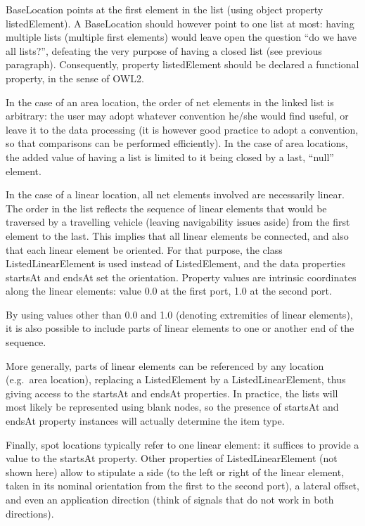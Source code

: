 \documentclass[
  11pt,
]{article}
\begin{document}
BaseLocation points at the first element in the list (using object
property listedElement). A BaseLocation should however point to one list
at most: having multiple lists (multiple first elements) would leave
open the question ``do we have all lists?'', defeating the very purpose
of having a closed list (see previous paragraph). Consequently, property
listedElement should be declared a functional property, in the sense of
OWL2.

In the case of an area location, the order of net elements in the linked
list is arbitrary: the user may adopt whatever convention he/she would
find useful, or leave it to the data processing (it is however good
practice to adopt a convention, so that comparisons can be performed
efficiently). In the case of area locations, the added value of having a
list is limited to it being closed by a last, ``null'' element.

In the case of a linear location, all net elements involved are
necessarily linear. The order in the list reflects the sequence of
linear elements that would be traversed by a travelling vehicle (leaving
navigability issues aside) from the first element to the last. This
implies that all linear elements be connected, and also that each linear
element be oriented. For that purpose, the class ListedLinearElement is
used instead of ListedElement, and the data properties startsAt and
endsAt set the orientation. Property values are intrinsic coordinates
along the linear elements: value 0.0 at the first port, 1.0 at the
second port.

By using values other than 0.0 and 1.0 (denoting extremities of linear
elements), it is also possible to include parts of linear elements to
one or another end of the sequence.

More generally, parts of linear elements can be referenced by any
location (e.g.~area location), replacing a ListedElement by a
ListedLinearElement, thus giving access to the startsAt and endsAt
properties. In practice, the lists will most likely be represented using
blank nodes, so the presence of startsAt and endsAt property instances
will actually determine the item type.

Finally, spot locations typically refer to one linear element: it
suffices to provide a value to the startsAt property. Other properties
of ListedLinearElement (not shown here) allow to stipulate a side (to
the left or right of the linear element, taken in its nominal
orientation from the first to the second port), a lateral offset, and
even an application direction (think of signals that do not work in both
directions).
\end{document}
